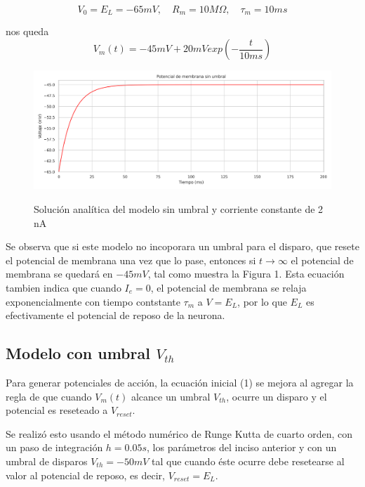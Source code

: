 \documentclass[12pt,letterpaper]{article}
\begin{document}
$$V_0 = E_L = -65 mV,\hspace{1em} R_m = 10 M\Omega, \hspace{1em} \tau_m = 10 ms$$

nos queda $$V_m(t) = -45mV + 20mV exp\left(- \dfrac{t}{10ms}\right)$$ 

\begin{figure}[h!]
\begin{floatrow}
\centering
\caption{Solución analítica del modelo sin umbral y corriente constante de 2 nA}
\includegraphics[width=16cm]{../images/sin_umbral.png}
\label{fig:esquema}
\end{floatrow}
\end{figure}


Se observa que si este modelo no incoporara un umbral para el disparo, que resete el potencial de membrana una vez que lo pase, entonces si $t \rightarrow \infty$ el potencial de membrana se quedará en $-45mV$, tal como muestra la Figura 1. Esta ecuación tambien indica que cuando $I_e = 0$, el potencial de membrana se relaja exponencialmente con tiempo contstante $\tau_m$ a $V = E_L$, por lo que $E_L$ es efectivamente el potencial de reposo de la neurona.


\subsection{Modelo con umbral $V_{th}$}

Para generar potenciales de acción, la ecuación inicial (1) se mejora al agregar la regla de que cuando $V_m(t)$ alcance un umbral $V_{th}$, ocurre un disparo y el potencial es reseteado a $V_{reset}$.

Se realizó esto usando el método numérico de Runge Kutta de cuarto orden, con un paso de integración $h = 0.05 s$, los parámetros del inciso anterior y con un umbral de disparos $V_{th} = -50mV$ tal que cuando éste ocurre debe resetearse al valor al potencial de reposo, es decir,  $V_{reset} = E_L$.
\end{document}
